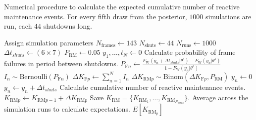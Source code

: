 \begin{algorithm}
	\caption{Numerical procedure to calculate the expected cumulative number of reactive maintenance events. For every fifth draw from the posterior, $1000$ simulations are run, each $44$ shutdowns long.}
  \label{algo:K_RM}
	\begin{algorithmic}[1]
    \State Assign simulation parameters
    \State $N_{\text{frames}} \gets 143$         
    \State $N_{\text{shuts}} \gets 44$           
    \State $N_{\text{runs}} \gets 1000$          
    \State $\Delta t_{shuts} \gets (6 \times 7)$ 
    \State $P_{\text{RM}} \gets 0.05$            
    \State
        \State $y_1, \dots, t_N \gets 0$         
          \State Calculate probability of frame failures in period between shutdowns.
          \State $P_{\text{F} n} \gets \frac{F_{\text{W}}(y_n + \Delta t_{shuts} | \theta^s) - F_{\text{W}}(y_n | \theta^s)}{1 - F_{\text{W}}(y_n | \theta^s)}$
          \State $I_n \sim \mbox{Bernoulli}(P_{\text{F} n})$   
          \State $\Delta K_{\text{F} p} \gets \sum^N_{n = 1} I_n$       
          \State $\Delta K_{\text{RM} p}\sim \mbox{Binom}(\Delta K_{\text{F} p}, P_{\text{RM}})$ 
              \State $y_n \gets 0$   
            \Else
              \State $y_n \gets y_n + \Delta t_{shuts}$   
            \EndIf
          \EndFor
          \State Calculate cumulative number of reactive maintenance events.
          \State $K_{\text{RM} p} \gets K_{\text{RM} p-1} + \Delta K_{\text{RM} p}$
        \EndFor
        \State Save $K_{\text{RM}} = \{K_{\text{RM}_1}, \dots, K_{\text{RM}_{N_{\text{shuts}}}}\}$.
      \EndFor
    \State Average across the simulation runs to calculate expectations.
    \State $E[K_{\text{RM}_p}]$
    \EndFor
	\end{algorithmic} 
\end{algorithm}

